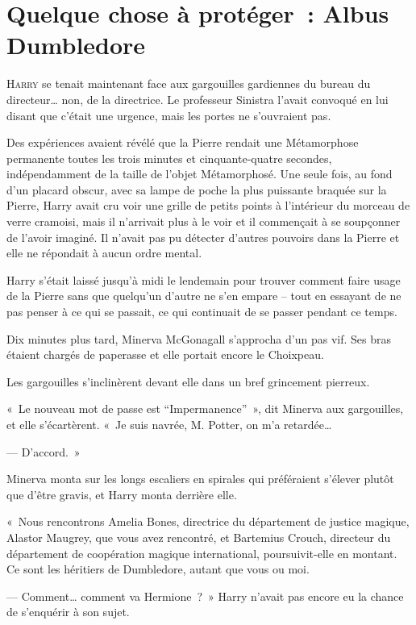\chapter{Quelque chose à protéger~: Albus Dumbledore}

\lettrine{H}{arry} se tenait maintenant face aux gargouilles gardiennes du bureau du directeur… non, de la directrice. Le professeur Sinistra l'avait convoqué en lui disant que c'était une urgence, mais les portes ne s'ouvraient pas.

Des expériences avaient révélé que la Pierre rendait une Métamorphose permanente toutes les trois minutes et cinquante-quatre secondes, indépendamment de la taille de l'objet Métamorphosé. Une seule fois, au fond d'un placard obscur, avec sa lampe de poche la plus puissante braquée sur la Pierre, Harry avait cru voir une grille de petits points à l'intérieur du morceau de verre cramoisi, mais il n'arrivait plus à le voir et il commençait à se soupçonner de l'avoir imaginé. Il n'avait pas pu détecter d'autres pouvoirs dans la Pierre et elle ne répondait à aucun ordre mental.

Harry s'était laissé jusqu'à midi le lendemain pour trouver comment faire usage de la Pierre sans que quelqu'un d'autre ne s'en empare -- tout en essayant de ne pas penser à ce qui se passait, ce qui continuait de se passer pendant ce temps.

Dix minutes plus tard, Minerva McGonagall s'approcha d'un pas vif. Ses bras étaient chargés de paperasse et elle portait encore le Choixpeau.

Les gargouilles s'inclinèrent devant elle dans un bref grincement pierreux.

«~Le nouveau mot de passe est “Impermanence”~», dit Minerva aux gargouilles, et elle s'écartèrent. «~Je suis navrée, M. Potter, on m'a retardée…

--- D'accord.~»

Minerva monta sur les longs escaliers en spirales qui préféraient s'élever plutôt que d'être gravis, et Harry monta derrière elle.

«~Nous rencontrons Amelia Bones, directrice du département de justice magique, Alastor Maugrey, que vous avez rencontré, et Bartemius Crouch, directeur du département de coopération magique international, poursuivit-elle en montant. Ce sont les héritiers de Dumbledore, autant que vous ou moi.

--- Comment… comment va Hermione~?~» Harry n'avait pas encore eu la chance de s'enquérir à son sujet.

